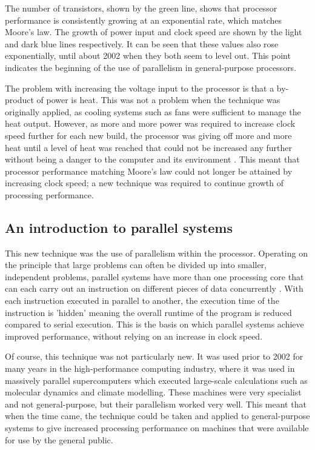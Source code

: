 \documentclass[a4paper, 12pt]{article}
\begin{document}
The number of transistors, shown by the green line, shows that processor performance is consistently growing at an exponential rate, which matches Moore's law. The growth of power input and clock speed are shown by the light and dark blue lines respectively. It can be seen that these values also rose exponentially, until about 2002 when they both seem to level out. This point indicates the beginning of the use of parallelism in general-purpose processors.

The problem with increasing the voltage input to the processor is that a by-product of power is heat. This was not a problem when the technique was originally applied, as cooling systems such as fans were sufficient to manage the heat output. However, as more and more power was required to increase clock speed further for each new build, the processor was giving off more and more heat until a level of heat was reached that could not be increased any further without being a danger to the computer and its environment \cite{Adv08}. This meant that processor performance matching Moore's law could not longer be attained by increasing clock speed; a new technique was required to continue growth of processing performance.

\subsection{An introduction to parallel systems}

This new technique was the use of parallelism within the processor. Operating on the principle that large problems can often be divided up into smaller, independent problems, parallel systems have more than one processing core that can each carry out an instruction on different pieces of data concurrently \cite{Got89}. With each instruction executed in parallel to another, the execution time of the instruction is 'hidden' meaning the overall runtime of the program is reduced compared to serial execution. This is the basis on which parallel systems achieve improved performance, without relying on an increase in clock speed.

Of course, this technique was not particularly new. It was used prior to 2002 for many years in the high-performance computing industry, where it was used in massively parallel supercomputers which executed large-scale calculations such as molecular dynamics and climate modelling. These machines were very specialist and not general-purpose, but their parallelism worked very well. This meant that when the time came, the technique could be taken and applied to general-purpose systems to give increased processing performance on machines that were available for use by the general public.
\end{document}

